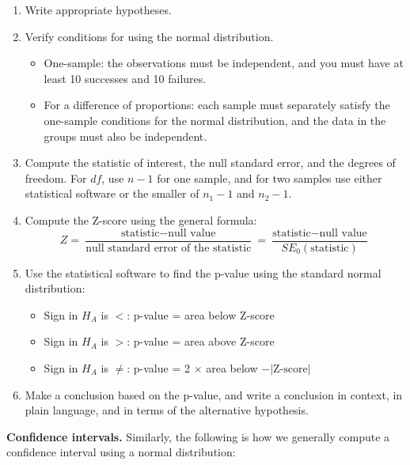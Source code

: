 \documentclass[
  10pt,
  openany]{book}
\providecommand{\tightlist}{%
  \setlength{\itemsep}{0pt}\setlength{\parskip}{0pt}}
\theoremstyle{definition}
\theoremstyle{definition}
\theoremstyle{definition}
\theoremstyle{definition}
\theoremstyle{remark}
\begin{document}
\begin{enumerate}
\def\labelenumi{\arabic{enumi}.}
\tightlist
\item
  Write appropriate hypotheses.\\
\item
  Verify conditions for using the normal distribution.

  \begin{itemize}
  \tightlist
  \item
    One-sample: the observations must be independent, and you must have at least 10 successes and 10 failures.\\
  \item
    For a difference of proportions: each sample must separately satisfy the one-sample conditions for the normal distribution, and the data in the groups must also be independent.
  \end{itemize}
\item
  Compute the statistic of interest, the null standard error, and the degrees of freedom. For \(df\), use \(n-1\) for one sample, and for two samples use either statistical software or the smaller of \(n_1 - 1\) and \(n_2 - 1\).\\
\item
  Compute the Z-score using the general formula: \[
   Z = \frac{\mbox{statistic} - \mbox{null value}}{\mbox{null standard error of the statistic}} = \frac{\mbox{statistic} - \mbox{null value}}{SE_0(\mbox{statistic})}
   \]
\item
  Use the statistical software to find the p-value using the standard normal distribution:

  \begin{itemize}
  \tightlist
  \item
    Sign in \(H_A\) is \(<\): p-value = area below Z-score
  \item
    Sign in \(H_A\) is \(>\): p-value = area above Z-score
  \item
    Sign in \(H_A\) is \(\neq\): p-value = 2 \(\times\) area below \(-|\mbox{Z-score}|\)
  \end{itemize}
\item
  Make a conclusion based on the p-value, and write a conclusion in context, in plain language, and in terms of the alternative hypothesis.
\end{enumerate}

\textbf{Confidence intervals.} Similarly, the following is how we generally compute a confidence interval using a normal distribution:
\end{document}
